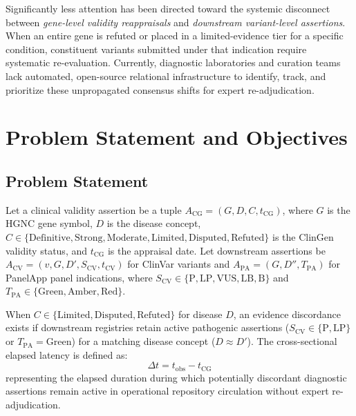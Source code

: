 \documentclass[conference]{IEEEtran}
\begin{document}
Significantly less attention has been directed toward the systemic disconnect between \textit{gene-level validity reappraisals} and \textit{downstream variant-level assertions}. When an entire gene is refuted or placed in a limited-evidence tier for a specific condition, constituent variants submitted under that indication require systematic re-evaluation. Currently, diagnostic laboratories and curation teams lack automated, open-source relational infrastructure to identify, track, and prioritize these unpropagated consensus shifts for expert re-adjudication.

\section{Problem Statement and Objectives}
\subsection{Problem Statement}
Let a clinical validity assertion be a tuple $A_{\text{CG}} = (G, D, C, t_{\text{CG}})$, where $G$ is the HGNC gene symbol, $D$ is the disease concept, $C \in \{\text{Definitive}, \text{Strong}, \text{Moderate}, \text{Limited}, \text{Disputed}, \text{Refuted}\}$ is the ClinGen validity status, and $t_{\text{CG}}$ is the appraisal date. Let downstream assertions be $A_{\text{CV}} = (v, G, D', S_{\text{CV}}, t_{\text{CV}})$ for ClinVar variants and $A_{\text{PA}} = (G, D'', T_{\text{PA}})$ for PanelApp panel indications, where $S_{\text{CV}} \in \{\text{P}, \text{LP}, \text{VUS}, \text{LB}, \text{B}\}$ and $T_{\text{PA}} \in \{\text{Green}, \text{Amber}, \text{Red}\}$.

When $C \in \{\text{Limited}, \text{Disputed}, \text{Refuted}\}$ for disease $D$, an evidence discordance exists if downstream registries retain active pathogenic assertions ($S_{\text{CV}} \in \{\text{P}, \text{LP}\}$ or $T_{\text{PA}} = \text{Green}$) for a matching disease concept ($D \approx D'$). The cross-sectional elapsed latency is defined as:
\begin{equation}
\Delta t = t_{\text{obs}} - t_{\text{CG}}
\end{equation}
representing the elapsed duration during which potentially discordant diagnostic assertions remain active in operational repository circulation without expert re-adjudication.
\end{document}
